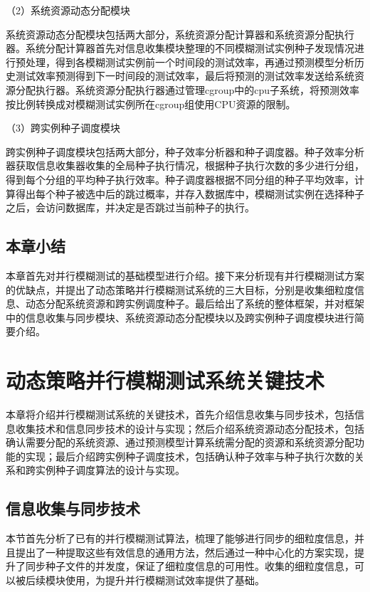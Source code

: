 \documentclass[master]{thesis-uestc}
\begin{document}
（2）系统资源动态分配模块

系统资源动态分配模块包括两大部分，系统资源分配计算器和系统资源分配执行器。系统分配计算器首先对信息收集模块整理的不同模糊测试实例种子发现情况进行预处理，得到各模糊测试实例前一个时间段的测试效率，再通过预测模型分析历史测试效率预测得到下一时间段的测试效率，最后将预测的测试效率发送给系统资源分配执行器。系统资源分配执行器通过管理cgroup中的cpu子系统，将预测效率按比例转换成对模糊测试实例所在cgroup组使用CPU资源的限制。

（3）跨实例种子调度模块

跨实例种子调度模块包括两大部分，种子效率分析器和种子调度器。种子效率分析器获取信息收集器收集的全局种子执行情况，根据种子执行次数的多少进行分组，得到每个分组的平均种子执行效率。种子调度器根据不同分组的种子平均效率，计算得出每个种子被选中后的跳过概率，并存入数据库中，模糊测试实例在选择种子之后，会访问数据库，并决定是否跳过当前种子的执行。

\section{本章小结}
本章首先对并行模糊测试的基础模型进行介绍。接下来分析现有并行模糊测试方案的优缺点，并提出了动态策略并行模糊测试系统的三大目标，分别是收集细粒度信息、动态分配系统资源和跨实例调度种子。最后给出了系统的整体框架，并对框架中的信息收集与同步模块、系统资源动态分配模块以及跨实例种子调度模块进行简要介绍。 

\chapter{动态策略并行模糊测试系统关键技术}

本章将介绍并行模糊测试系统的关键技术，首先介绍信息收集与同步技术，包括信息收集技术和信息同步技术的设计与实现；然后介绍系统资源动态分配技术，包括确认需要分配的系统资源、通过预测模型计算系统需分配的资源和系统资源分配功能的实现；最后介绍跨实例种子调度技术，包括确认种子效率与种子执行次数的关系和跨实例种子调度算法的设计与实现。

\section{信息收集与同步技术}

本节首先分析了已有的并行模糊测试算法，梳理了能够进行同步的细粒度信息，并且提出了一种提取这些有效信息的通用方法，然后通过一种中心化的方案实现，提升了同步种子文件的并发度，保证了细粒度信息的可用性。收集的细粒度信息，可以被后续模块使用，为提升并行模糊测试效率提供了基础。
\end{document}
